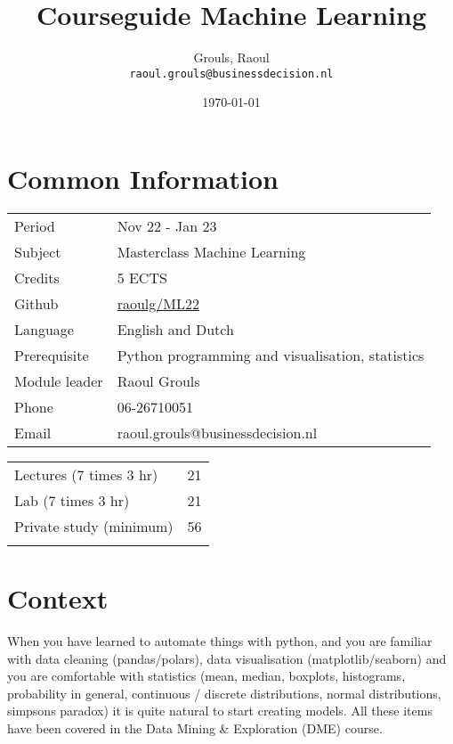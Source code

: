 \documentclass[10pt]{article}
\title{Courseguide Machine Learning}
\author{Grouls, Raoul \\
    \texttt{raoul.grouls@businessdecision.nl}
    }
\date{\today}
\begin{document}
\maketitle
\section{Common Information}

\begin{table}[h]
    \begin{tabular}{ll}
     Period & Nov 22 - Jan 23 \\
     Subject & Masterclass Machine Learning \\
     Credits & 5 ECTS \\
     Github & \href{https://github.com/raoulg/ML22}{raoulg/ML22}\\
     Language & English and Dutch \\
     Prerequisite & Python programming and visualisation, statistics \\
     Module leader & Raoul Grouls \\
     Phone & 06-26710051 \\
     Email & raoul.grouls@businessdecision.nl
    \end{tabular}
\end{table}

\begin{table}[h]
    \begin{tabular}{ll}
     Lectures (7 times 3 hr)& 21 \\
     Lab (7 times 3 hr)& 21 \\
     Private study (minimum) & 56 \\
     & 
    \end{tabular}
\end{table}

\section{Context}

When you have learned to automate things with python, and you are familiar
with data cleaning (pandas/polars), data visualisation (matplotlib/seaborn)
and you are comfortable with statistics (mean, median, boxplots, histograms, 
probability in general, continuous / discrete distributions, normal distributions,
simpsons paradox) it is quite natural to start creating models.
All these items have been covered in the Data Mining \& Exploration (DME) course.
\end{document}
